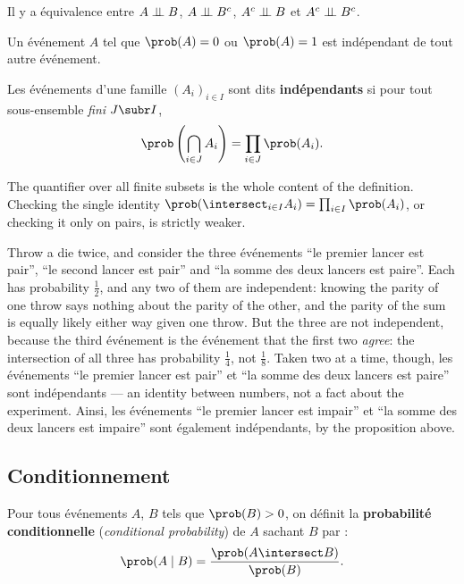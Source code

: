 \begin{prop}
  Il y a équivalence entre $A \perp\!\!\!\perp B$, $A \perp\!\!\!\perp B^{c}$, $A^{c} \perp\!\!\!\perp B$ et
  $A^{c} \perp\!\!\!\perp B^{c}$.
\end{prop}

\begin{prop}
  Un événement $A$ tel que $\prob(A) = 0$ ou $\prob(A) = 1$ est indépendant de
  tout autre événement.
\end{prop}

\begin{definition}
  Les événements d'une famille $(A_{i})_{i \in I}$ sont dits
  \textbf{indépendants} si pour tout sous-ensemble \emph{fini} $J \subr I$,
  \[ \prob\left( \bigcap_{i \in J} A_{i} \right)
       = \prod_{i \in J} \prob(A_{i}). \]
\end{definition}

The quantifier over all finite subsets is the whole content of the definition.
Checking the single identity $\prob(\intersect_{i \in I} A_{i}) = \prod_{i \in I}
\prob(A_{i})$, or checking it only on pairs, is strictly weaker.

\begin{example}
  Throw a die twice, and consider the three événements ``le premier lancer est
  pair'', ``le second lancer est pair'' and ``la somme des deux lancers est
  paire''. Each has probability $\tfrac{1}{2}$, and any two of them are
  independent: knowing the parity of one throw says nothing about the parity of
  the other, and the parity of the sum is equally likely either way given one
  throw. But the three are not independent, because the third événement is the
  événement that the first two \emph{agree}: the intersection of all three has
  probability $\tfrac{1}{4}$, not $\tfrac{1}{8}$. Taken two at a time, though,
  les événements ``le premier lancer est pair'' et ``la somme des deux lancers
  est paire'' sont indépendants --- an identity between numbers, not a fact
  about the experiment. Ainsi, les événements ``le premier lancer est impair'' et
  ``la somme des deux lancers est impaire'' sont également indépendants, by the
  proposition above.
\end{example}

\subsection{Conditionnement}

\begin{definition}
  Pour tous événements $A$, $B$ tels que $\prob(B) > 0$, on définit la
  \textbf{probabilité conditionnelle} (\textit{conditional probability}) de $A$
  sachant $B$ par :
  \[ \prob(A \mid B) = \frac{\prob(A \intersect B)}{\prob(B)}. \]
\end{definition}


